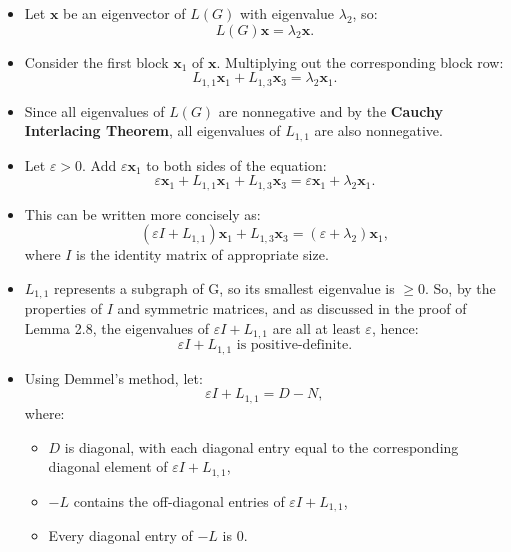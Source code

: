 \documentclass[aspectratio=169]{beamer}
\begin{document}
\begin{frame}

\begin{itemize}
  \item Let \( \mathbf{x} \) be an eigenvector of \( L(G) \) with eigenvalue \( \lambda_2 \), so:
  \[
  L(G)\mathbf{x} = \lambda_2 \mathbf{x}.
  \]

  \item Consider the first block \( \mathbf{x}_1 \) of \( \mathbf{x} \). Multiplying out the corresponding block row:
  \[
  L_{1,1}\mathbf{x}_1 + L_{1,3}\mathbf{x}_3 = \lambda_2 \mathbf{x}_1.
  \]

  \item Since all eigenvalues of \( L(G) \) are nonnegative and by the \textbf{Cauchy Interlacing Theorem}, all eigenvalues of \( L_{1,1} \) are also nonnegative.

  \item Let \( \varepsilon > 0 \). Add \( \varepsilon \mathbf{x}_1 \) to both sides of the equation:
  \[
  \varepsilon \mathbf{x}_1 + L_{1,1} \mathbf{x}_1 + L_{1,3} \mathbf{x}_3 = \varepsilon \mathbf{x}_1 + \lambda_2 \mathbf{x}_1.
  \]

  \item This can be written more concisely as:
  \[
  (\varepsilon I + L_{1,1})\mathbf{x}_1 + L_{1,3} \mathbf{x}_3 = (\varepsilon + \lambda_2) \mathbf{x}_1,
  \]
  where \( I \) is the identity matrix of appropriate size.

\end{itemize}
\end{frame}
\begin{frame}


\begin{itemize}
  \item  \( L_{1,1} \) represents a subgraph of G, so its smallest eigenvalue is \( \ge 0 \). So, by the properties of \( I \) and symmetric matrices, and as discussed in the proof of Lemma 2.8, the eigenvalues of \( \varepsilon I + L_{1,1} \) are all at least \( \varepsilon \), hence:
  \[
  \varepsilon I + L_{1,1} \text{ is positive-definite}.
  \]

  \item Using Demmel’s method, let:
  \[
  \varepsilon I + L_{1,1} = D - N,
  \]
  where:
  \begin{itemize}
    \item \( D \) is diagonal, with each diagonal entry equal to the corresponding diagonal element of \( \varepsilon I + L_{1,1} \),
    \item \( -L \) contains the off-diagonal entries of \( \varepsilon I + L_{1,1} \),
    \item Every diagonal entry of \( -L \) is 0.
  \end{itemize}
\end{itemize}
\end{frame}
\end{document}
